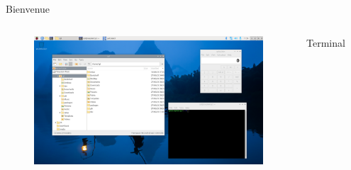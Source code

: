 \documentclass[aspectratio=169,xcolor=dvipsnames]{beamer}
\begin{document}
\begin{frame}{Bienvenue}
    \begin{columns}[c] %

        \begin{figure}
            \includegraphics[width=1\textwidth]{images/rpi-os-welcome.png}
        \end{figure}

        \begin{center}
            Terminal
            \begin{figure}
                \includegraphics[width=0.7\textwidth]{images/terminal.png}
            \end{figure}


\end{center}
\end{columns}
\end{frame}
\end{document}
